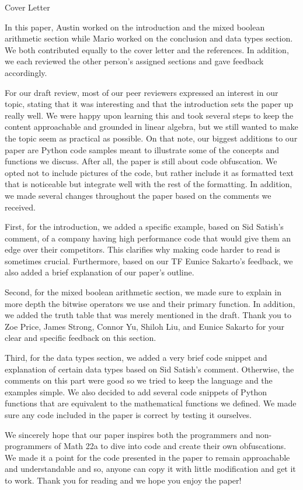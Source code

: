 \begin{center}
    {\huge Cover Letter}
\end{center}
\hspace{\parindent} In this paper, Austin worked on the introduction and the
mixed boolean arithmetic section while Mario worked on the conclusion and data
types section. We both contributed equally to the cover letter and the
references. In addition, we each reviewed the other person's assigned sections
and gave feedback accordingly.


For our draft review, most of our peer reviewers expressed
an
interest in our
topic, stating that it was interesting and that the introduction sets the paper
up really well. We were happy upon learning this and took several steps to keep
the content approachable and grounded in linear algebra, but we still wanted to
make the topic seem as practical as possible. On that note, our biggest
additions to our paper are Python code samples meant to illustrate some of the
concepts and functions we discuss. After all, the paper is still about code
obfuscation. We opted not to include pictures of the code, but rather include
it as formatted text that is noticeable but integrate well with the rest of the
formatting. In addition, we made several changes throughout the paper based on
the comments we received.

First, for the introduction, we added a specific example, based on Sid Satish's
comment, of a company having high performance code that would give them an edge
over their competitors. This clarifies why making code harder to read is
sometimes crucial. Furthermore, based on our TF Eunice Sakarto's feedback, we
also added a brief explanation of our paper's outline.

Second, for the mixed boolean arithmetic section, we made sure to explain in
more depth the bitwise operators we use and their primary function. In
addition, we added the truth table that was merely mentioned in the draft.
Thank you to Zoe Price, James Strong, Connor Yu, Shiloh Liu, and Eunice Sakarto
for your clear and specific feedback on this section.

Third, for the data types section, we added a very brief code snippet and
explanation of certain data types based on Sid Satish's comment. Otherwise,
the comments on this part were good so we tried to keep the language and the
examples simple. We also decided to add several code snippets of Python
functions that are equivalent to the mathematical functions we defined. We made
sure any code included in the paper is correct by testing it ourselves.

We sincerely hope that our paper inspires both the programmers and
non-programmers of Math 22a to dive into code and create their own
obfuscations. We made it a point for the code presented in the paper to remain
approachable and understandable and so, anyone can copy it with little
modification and get it to work. Thank you for reading and we hope you
enjoy the paper!
\newpage